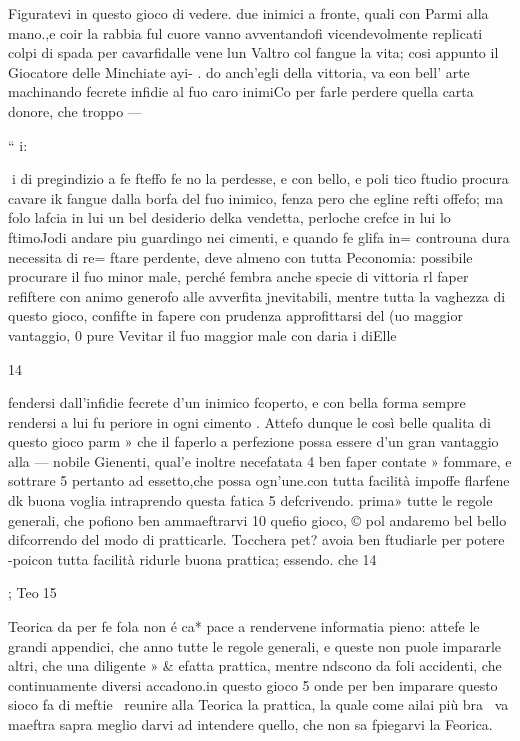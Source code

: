 \documentclass[12pt,a6paper]{article}
\begin{document}
Figuratevi in questo gioco di
vedere. due inimici a fronte,
quali con Parmi alla mano.,e
coir la rabbia ful cuore vanno
avventandofi vicendevolmente
replicati colpi di spada per cavarfidalle vene lun Valtro col
fangue la vita; cosi appunto il
Giocatore delle Minchiate ayi- .
do anch’egli della vittoria, va
eon bell’ arte machinando fecrete infidie al fuo caro inimiCo per farle perdere quella carta donore, che troppo —

“ i:

 
i
di pregindizio a fe fteffo fe no
la perdesse, e con bello, e poli
tico ftudio procura cavare ik
fangue dalla borfa del fuo inimico, fenza pero che egline
refti offefo; ma folo lafcia in lui
un bel desiderio delka vendetta,
perloche crefce in lui lo ftimoJodi andare piu guardingo nei
cimenti, e quando fe glifa in=
controuna dura necessita di re=
ftare perdente, deve almeno
con tutta Peconomia: possibile
procurare il fuo minor male,
perché fembra anche specie di
vittoria rl faper refiftere con
animo generofo alle avverfita
jnevitabili, mentre tutta la vaghezza di questo gioco, confifte
in fapere con prudenza approfittarsi del (uo maggior vantaggio, 0 pure Vevitar il fuo maggior male con daria i diElle
 

 

14

fendersi dall’infidie fecrete d'un
inimico fcoperto, e con bella
forma sempre rendersi a lui fu
periore in ogni cimento .
Attefo dunque le così belle
qualita di questo gioco parm »
che il faperlo a perfezione possa
essere d’un gran vantaggio alla —
nobile Gienenti, qual’e inoltre
necefatata 4 ben faper contate »
fommare, e sottrare 5 pertanto
ad essetto,che possa ogn’une.con
tutta facilità impoffe flarfene dk
buona voglia intraprendo questa fatica 5 defcrivendo. prima»
tutte le regole generali, che
pofiono ben ammaeftrarvi 10
quefio gioco, © pol andaremo
bel bello difcorrendo del modo
di pratticarle. Tocchera pet?
avoia ben ftudiarle per potere
-poicon tutta facilità ridurle
buona prattica; essendo. che 14

; Teo15

Teorica da per fe fola non é ca*
pace a rendervene informatia
pieno: attefe le grandi appendici, che anno tutte le regole generali, e queste non puole impararle altri, che una diligente »
& efatta prattica, mentre ndscono da foli accidenti, che continuamente diversi accadono.in
questo gioco 5 onde per ben imparare questo sioco fa di meftie~
reunire alla Teorica la prattica, la quale come ailai più bra~
va maeftra sapra meglio darvi
ad intendere quello, che non sa
fpiegarvi la Feorica.
\end{document}
